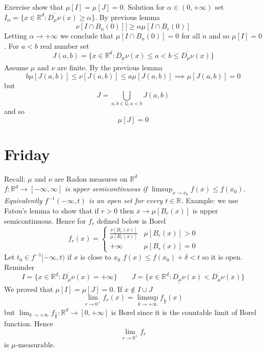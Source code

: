 \documentclass[11pt]{article}
\begin{document}
Exercise show that $\mu[I] = \mu[J] = 0$. Solution for $\alpha \in (0,+\infty)$ set $I_\alpha = \{x \in \mathbb{R}^{d} : \overline{D_\mu \nu}(x) \ge \alpha\}$.
By previous lemma
\[
    \nu[I \cap B_n(0)]] \ge \alpha\mu[I \cap B_r(0)]
\] 
Letting  $\alpha \rightarrow +\infty$ we conclude that $\mu[I \cap B_n(0)] = 0$ for all $n$ and so  $\mu[I] = 0$.
For $a < b$ real number set 
 \[
     J(a,b) = \{x \in \mathbb{R}^{d}: \underline{D_\mu \nu}(x) \le a < b \le \overline{D_\mu \nu}(x)\}
\] 
Assume $\mu$ and $\nu$ are finite. By the  previous lemma
\[
    b\mu[J(a,b)] \le \nu[J(a,b)] \le a \mu[J(a,b)]  \implies \mu[J(a,b)] = 0
\] 
but
\[
    J = \bigcup_{a,b \in \mathbb{Q}, a < b} J(a,b)
\] 
and so
\[
\mu[J] = 0
\] 

\section{Friday}
Recall: $ \mu $ and $\nu $ are Radon measures on $ \mathbb{R}^{d}$ \\
\emph{
    $f : \mathbb{R}^{d} \rightarrow [-\infty,\infty]$ is upper semicontinuous if $\limsup_{x\to x_0} f(x) \le f(x_0)$. Equivalently
    $f^{-1}(-\infty,t)$ is an open set for every $t \in \mathbb{R}$.
}
Example: we use Fatou's lemma to show that if  $r > 0$ then $x \rightarrow \mu[B_r(x)]$ is upper semicontinuous. Hence
for $f_r$ defined below is Borel
\emph{
    \[
    f_r(x) = 
    \begin{cases}
        \frac{\nu[B_r(x)]}{\mu[B_r(x)]} & \mu[B_r(x)] >0\\
        +\infty & \mu[B_r(x)] = 0
    \end{cases}
    \] 
} 
Let $t_0 \in f^{-1}[-\infty,t)$ if $x$ is close to  $x_0$ $f(x) \le f(x_0) + \delta < t$ so it is open.
Reminder
\[
    I = \{x \in \mathbb{R}^{d} : \overline{D_\mu \nu}(x) = +\infty\} \qquad J = \{x \in \mathbb{R}^{d}: \underline{D_\mu \nu}(x) < \overline{D_\mu \nu}(x)\}
\] 
We proved that $\mu[I] = \mu[J] = 0$. If $x \not \in I \cup J$
 \[
     \lim_{r\to  0^{+}}f_r(x) = \limsup_{k\to +\infty}f_{\frac{1}{k}}(x)
\] 
but $\lim_{k\to +\infty}f_{\frac{1}{k}} : \mathbb{R}^{d} \rightarrow [0,+\infty]$ is Borel since it is the countable limit of Borel function.
Hence
\[
\lim_{r\to 0^{+}}f_r
\] 
is $\mu$-measurable.
\end{document}
